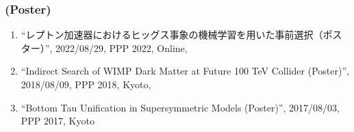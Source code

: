 \documentclass[12pt]{article}
\begin{document}
\subsubsection*{(Poster)}
\begin{enumerate}
 \item ``レプトン加速器におけるヒッグス事象の機械学習を用いた事前選択（ポスター）'', 2022/08/29, PPP 2022, Online,\item ``Indirect Search of WIMP Dark Matter at Future 100 TeV Collider (Poster)'', 2018/08/09, PPP 2018, Kyoto,\item ``Bottom Tau Unification in Supersymmetric Models (Poster)'', 2017/08/03, PPP 2017, Kyoto
\end{enumerate}

\end{document}
